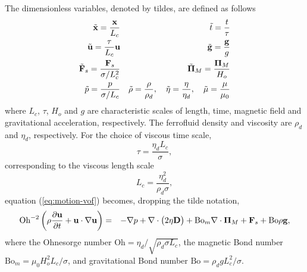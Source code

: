 The dimensionless variables, denoted by tildes, are defined as follows
\begin{align*}
  \tilde{\textbf{x}} = \frac{\textbf{x}}{L_c} 		&& \tilde{t} = \frac{t}{\tau}\\
  \tilde{\textbf{u}} = \frac{\tau}{L_c}\textbf{u}     &&\quad \tilde{\bf g} = \frac{{\bf g}}{g}\\
   \tilde{{\bf F}}_s = \frac{{\bf F}_s}{\sigma/L_c^2}            && \tilde{{\mathbf \Pi}}_M =  \frac{{\mathbf \Pi}_M}{H_o}\\ 
  \tilde{p} = \frac{p}{\sigma/L_c} && \tilde{\rho}=\frac{\rho}{\rho_d},\quad \tilde{\eta}=\frac{\eta}{\eta_d},\quad \tilde{\mu}=\frac{\mu}{\mu_0}
\end{align*}
where $L_c$, $\tau$, $H_o$ and $g$ are characteristic scales of length, time, magnetic field and gravitational acceleration, respectively. The ferrofluid density and viscosity are ${\rho_d}$ and ${\eta_d}$, respectively. For the choice of viscous time scale, 
$$
\tau = \frac{\eta_d L_c}{\sigma},
$$
corresponding to the viscous length scale
$$
L_{c} = \frac{\eta_d^2}{\rho_d\sigma},
$$
equation (\ref{eq:motion-vof}) becomes, dropping the tilde notation,
\begin{eqnarray}  
\mbox{Oh}^{-2}\left(\rho \frac{\partial{\mathbf u}}{\partial t}+{\mathbf u}\cdot\nabla {\mathbf u}\right)&=&-\nabla p + \nabla\cdot \bigl(2\eta {\bf D} \bigr) + \mbox{Bo}_{m}\nabla\cdot{\mathbf \Pi}_M + {\mathbf F}_s + \mbox{Bo} \rho{\mathbf g},
\label{eq:motion1}
\end{eqnarray}
where the Ohnesorge number $\mbox{Oh}=\eta_d/\sqrt{\rho_d \sigma L_c}$, the magnetic Bond number $\mbox{Bo}_{m}=\mu_0H^2_oL_c/\sigma$, and gravitational Bond number $\mbox{Bo}=\rho_d g L_c^2/\sigma$.


